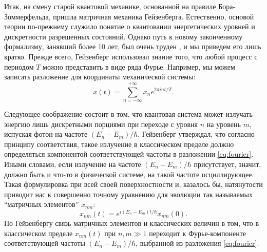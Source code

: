 \documentclass[14pt, a4paper]{extreport}
\numberwithin{equation}{section}
\begin{document}
Итак, на смену старой квантовой механике, основанной на правиле Бора-Зоммерфельда, пришла матричная механика Гейзенберга. Естественно, основой теории по-прежнему служило понятие о квантовании энергетических уровней и дискретности разрешенных состояний. Однако путь к новому законченному формализму, занявший более 10 лет, был очень труден \cite{van2007sources}, и мы приведем его лишь кратко. Прежде всего, Гейзенберг использовал знание того, что любой процесс с периодом $T$ можно представить в виде ряда Фурье. Например, мы можем записать разложение для координаты механической системы:
\begin{equation}
	x(t) = \sum_{n=-\infty}^{+\infty} x_n e^{2\pi i n t/T}.\label{eq:fourier}
\end{equation}

Следующее соображение состоит в том, что квантовая система может излучать энергию лишь дискретными порциями при переходе с уровня $n$ на уровень $m$, испуская фотон на частоте $(E_n - E_m)/\hbar$. Гейзенберг утверждал, что согласно принципу соответствия, такое излучение в классическом пределе должно определяться компонентой соответствующей частоты в разложении \eqref{eq:fourier}. Иными словами, если излучение на частоте $(E_n - E_m)/\hbar$ присутствует, значит, должно быть и что-то в физической системе, на такой частоте осциллирующее. Такая формулировка при всей своей поверхностности и, казалось бы, натянутости приводит нас к совершенно точному уравнению для эволюции так называемых ``матричных элементов'' $x_{nm}$:
\begin{equation}
	x_{nm}(t) = e^{i (E_n - E_m) t / \hbar} x_{nm}(0).\label{eq:heisenberg_evolution}
\end{equation}
По Гейзенбергу связь матричных элементов и классических величин в том, что в классическом пределе $x_{nm}(t)$ при $n, m \gg 1$ переходит к Фурье-компоненте соответствующей частоты $(E_n - E_m)/\hbar$, выбранной из разложения \eqref{eq:fourier}. 
\end{document}
